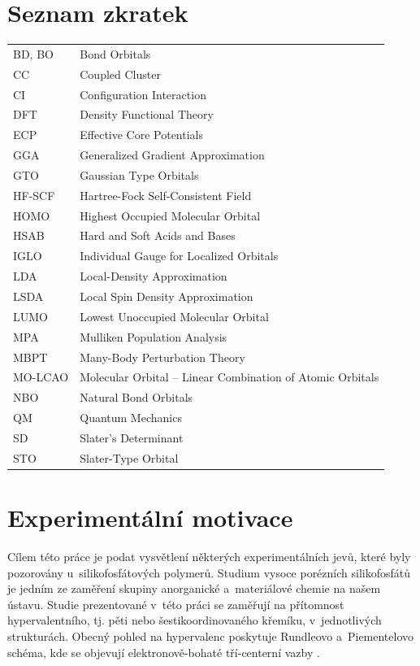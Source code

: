 \documentclass[
digital, %
table,   %
nolof,     %
nolot,     %
oneside,
]{fithesis3}
\begin{document}
\chapter*{Seznam zkratek}
\begin{table}[htbp]
\begin{tabular}{l l}
  BD, BO & Bond Orbitals \\
CC & Coupled Cluster \\
CI & Configuration Interaction \\
DFT & Density Functional Theory \\
ECP & Effective Core Potentials \\
GGA &  Generalized Gradient Approximation \\
GTO & Gaussian Type Orbitals \\
HF-SCF & Hartree-Fock Self-Consistent Field \\
HOMO  & Highest Occupied Molecular Orbital \\
HSAB & Hard and Soft Acids and Bases \\
IGLO & Individual Gauge for Localized Orbitals \\
LDA & Local-Density Approximation \\
LSDA & Local Spin Density Approximation \\
LUMO & Lowest Unoccupied Molecular Orbital \\
MPA & Mulliken Population Analysis \\
MBPT &  Many-Body Perturbation Theory \\
MO-LCAO & Molecular Orbital – Linear Combination of Atomic Orbitals \\
NBO & Natural Bond Orbitals \\
QM & Quantum Mechanics \\
SD & Slater's Determinant \\
STO & Slater-Type Orbital  \\
\end{tabular}
\end{table}

\chapter{Experimentální motivace}
Cílem této práce je podat vysvětlení některých experimentálních jevů, které byly pozorovány u~silikofosfátových polymerů. Studium vysoce porézních silikofosfátů je jedním ze zaměření skupiny anorganické a~materiálové chemie na našem ústavu. Studie prezentované v~této práci se zaměřují na přítomnost hypervalentního, tj. pěti nebo šestikoordinovaného křemíku, v~jednotlivých strukturách. Obecný pohled na hypervalenc poskytuje Rundleovo a~Piementelovo schéma, kde se objevují elektronově-bohaté tří-centerní vazby \cite{405827, Munzarova2001}.
\end{document}
